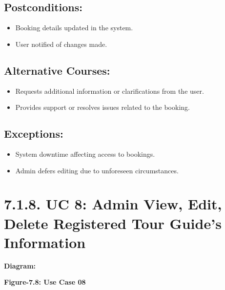 \documentclass{scrreprt}
\begin{document}
\subsection*{\textbf{Postconditions:}}

\begin{itemize}
    \item Booking details updated in the system.
    \item User notified of changes made.
\end{itemize}

\subsection*{\textbf{Alternative Courses:}}

\begin{itemize}
    \item Requests additional information or clarifications from the user.
    \item Provides support or resolves issues related to the booking.
\end{itemize}

\subsection*{\textbf{Exceptions:}}

\begin{itemize}
    \item System downtime affecting access to bookings.
    \item Admin defers editing due to unforeseen circumstances.
\end{itemize}

\section*{\textbf{7.1.8. UC 8: Admin View, Edit, Delete Registered Tour Guide's Information}}
\textbf{Diagram:}
\newline

\begin{center}
    \parbox{0.8\textwidth}{ 
        \centering
    }
\end{center}
\begin{center}
    \parbox{0.8\textwidth}{ 
        \centering
        \textbf{Figure-7.8: Use Case 08}
    }
\end{center}
\end{document}
